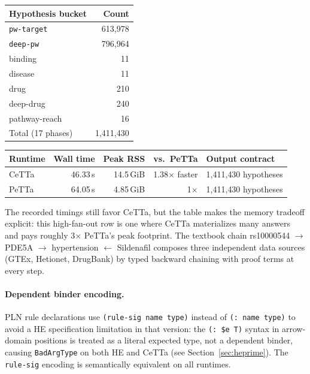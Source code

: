 \documentclass[11pt]{article}
\newcommand{\code}[1]{\texttt{#1}}
\newcommand{\PeTTa}{\textup{PeTTa}}
\newcommand{\CeTTa}{\textup{CeTTa}}
\begin{document}
\begin{center}
\begin{tabular}{lr}
\toprule
Hypothesis bucket & Count \\
\midrule
\code{pw-target} & 613{,}978 \\
\code{deep-pw} & 796{,}964 \\
binding & 11 \\
disease & 11 \\
drug & 210 \\
deep-drug & 240 \\
pathway-reach & 16 \\
\midrule
Total (17 phases) & 1{,}411{,}430 \\
\bottomrule
\end{tabular}
\end{center}

\begin{center}
\begin{tabular}{lrrrl}
\toprule
Runtime & Wall time & Peak RSS & vs.\ \PeTTa{} & Output contract \\
\midrule
\CeTTa{} & 46.33\,s & 14.5\,GiB & 1.38$\times$ faster & 1{,}411{,}430 hypotheses \\
\PeTTa{} & 64.05\,s & 4.85\,GiB & 1$\times$ & 1{,}411{,}430 hypotheses \\
\bottomrule
\end{tabular}
\end{center}

\noindent The recorded timings still favor \CeTTa{}, but the table makes
the memory tradeoff explicit: this high-fan-out row is one where
\CeTTa{} materializes many answers and pays roughly 3$\times$ \PeTTa{}'s
peak footprint.
The textbook chain
rs10000544 $\to$ PDE5A $\to$ hypertension $\leftarrow$ Sildenafil
composes three independent data sources (GTEx, Hetionet, DrugBank) by
typed backward chaining with proof terms at every step.

\paragraph{Dependent binder encoding.}
PLN rule declarations use \code{(rule-sig name type)} instead of
\code{(: name type)} to avoid a HE specification limitation in that version: the
\code{(: \$e T)} syntax in arrow-domain positions is treated as a
literal expected type, not a dependent binder, causing \code{BadArgType}
on both HE and \CeTTa{} (see Section~\ref{sec:heprime}).
The \code{rule-sig} encoding is semantically equivalent on all runtimes.
\end{document}
